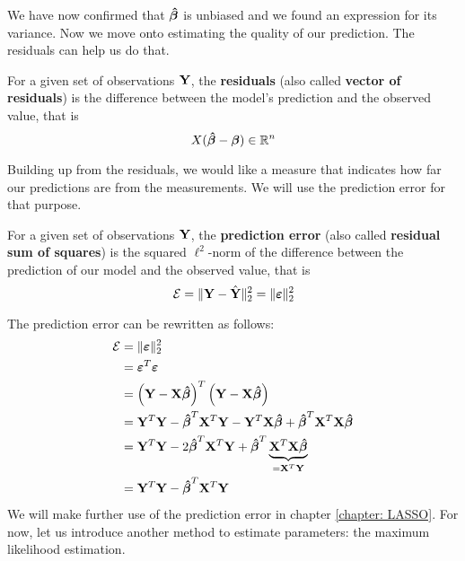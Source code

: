 We have now confirmed that \( \boldsymbol{\hat{\beta}} \) is unbiased and we found an expression for its variance. Now we move onto estimating the quality of our prediction. The residuals can help us do that.
\begin{definition}[Residuals]
    For a given set of observations \(\mathbf{Y}\), the \textbf{residuals} (also called \textbf{vector of residuals}) is the difference between the model's prediction and the observed value, that is
    \[
        X (\boldsymbol{\hat{\beta}} - \boldsymbol{\beta}) \in \mathbb{R}^n
    \]
\end{definition}
Building up from the residuals, we would like a measure that indicates how far our predictions are from the measurements. We will use the prediction error for that purpose.
\begin{definition}
    For a given set of observations \(\mathbf{Y}\), the \textbf{prediction error} (also called \textbf{residual sum of squares}) is the squared \(\ell^2\)-norm of the difference between the prediction of our model and the observed value, that is
    \[
        \mathcal{E} = \| \mathbf{Y} - \hat{\mathbf{Y}} \|_2^2 = \| \boldsymbol{\varepsilon} \|_2^2
    \]
\end{definition}
The prediction error can be rewritten as follows:
\begin{align*}
    \mathcal{E}
     & = \| \boldsymbol{\varepsilon} \|_2^2                                                                     \\
     & = \boldsymbol{\varepsilon}^T \boldsymbol{\varepsilon}                                                                        \\
     & = \left( \mathbf{Y} - \mathbf{X} \boldsymbol{\hat{\beta}} \right)^T \left(\mathbf{Y} - \mathbf{X} \boldsymbol{\hat{\beta}}  \right)                    \\
     & = \mathbf{Y}^T \mathbf{Y} - \boldsymbol{\hat{\beta}}^T \mathbf{X}^T \mathbf{Y} - \mathbf{Y}^T \mathbf{X} \boldsymbol{\hat{\beta}} + \boldsymbol{\hat{\beta}}^T \mathbf{X}^T \mathbf{X} \boldsymbol{\hat{\beta}}          \\
     & = \mathbf{Y}^T \mathbf{Y} - 2 \boldsymbol{\hat{\beta}}^T \mathbf{X}^T \mathbf{Y} + \boldsymbol{\hat{\beta}}^T \underbrace{\mathbf{X}^T \mathbf{X} \boldsymbol{\hat{\beta}}}_{= \mathbf{X}^T \mathbf{Y}} \\
     & = \mathbf{Y}^T \mathbf{Y} - \boldsymbol{\hat{\beta}}^T \mathbf{X}^T \mathbf{Y}                                                        \\
\end{align*}
We will make further use of the prediction error in chapter \ref{chapter: LASSO}. For now, let us introduce another method to estimate parameters: the maximum likelihood estimation.

